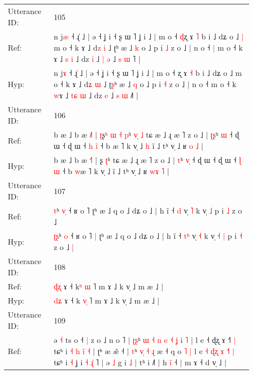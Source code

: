 \documentclass[10pt]{article}
\DeclareRobustCommand{\hl}[1]{{\textcolor{red}{#1}}}
\begin{document}
\begin{longtable}{ll}
 \\
\midrule
Utterance ID: & 105 \\
Ref: & n j\hl{æ} ˧ ɻ̍ ˩ | ə ˧ ʝ i ˧ ʂ ɯ ˥ ʝ i ˩ | m o ˧ \hl{ɖ}ʐ ɤ \hl{˥} b i ˩ dʑ o ˩\hl{ }\hl{|} m o ˧ k ɤ ˩ d\hl{z} \hl{i} ˩ ʈ\hl{}ʰ æ ˩ \hl{k} o ˩ p i \hl{˩} z o ˩ | n o ˧\hl{ }\hl{|} m o ˧ k \hl{}ɤ ˩ \hl{}\hl{s} \hl{i} ˩ dz \hl{i} ˩ \hl{|} \hl{ə} ˩\hl{ }\hl{s}\hl{ }\hl{ɯ}\hl{ }˥ |
 \\
Hyp: & n j\hl{ɤ} ˧ ɻ̍ ˩ | ə ˧ ʝ i ˧ ʂ ɯ ˥ ʝ i ˩ | m o ˧ \hl{}ʐ ɤ \hl{˧} b i ˩ dʑ o ˩\hl{}\hl{} m o ˧ k ɤ ˩ d\hl{ʑ} \hl{ɯ} ˩ ʈ\hl{ʂ}ʰ æ ˩ \hl{q} o ˩ p i \hl{˧} z o ˩ | n o ˧\hl{}\hl{} m o ˧ k \hl{w}ɤ ˩ \hl{t}\hl{ɕ} \hl{ɯ} ˩ dz \hl{e} ˩ \hl{s} \hl{ɯ} ˩\hl{}\hl{}\hl{}\hl{}\hl{}˥ |
 \\
\midrule
Utterance ID: & 106 \\
Ref: & b æ ˩ b æ \hl{˩}˥ | \hl{ʈ}ʂ\hl{ʰ}\hl{ }\hl{ɯ}\hl{ }\hl{˧} \hl{p}ʰ\hl{ }\hl{v}\hl{̩}\hl{ }\hl{˩} tɕ æ ˩ ɻ æ ˥ z o ˩ | \hl{ʈ}\hl{ʂ}ʰ \hl{}\hl{ɯ} ˧ ɖ ɯ ˧ ɖ ɯ ˧ \hl{h} \hl{i}\hl{̃} ˧ b \hl{}æ ˥ k v̩ ˩\hl{ }\hl{h} ĩ ˩ tʰ v̩ ˩ ʁ \hl{}\hl{o} \hl{˩} |
 \\
Hyp: & b æ ˩ b æ \hl{˧}˥ | \hl{}ʂ\hl{}\hl{}\hl{}\hl{}\hl{} \hl{ʈ}ʰ\hl{}\hl{}\hl{}\hl{}\hl{} tɕ æ ˩ ɻ æ ˥ z o ˩ | \hl{}\hl{t}ʰ \hl{v}\hl{̩} ˧ ɖ ɯ ˧ ɖ ɯ ˧ \hl{ɭ} \hl{}\hl{ɯ} ˧ b \hl{w}æ ˥ k v̩ ˩\hl{}\hl{} ĩ ˩ tʰ v̩ ˩ ʁ \hl{w}\hl{ɤ} \hl{˥} |
 \\
\midrule
Utterance ID: & 107 \\
Ref: & \hl{}\hl{t}ʰ \hl{v}\hl{̩} ˧ ʁ o ˥\hl{}\hl{} ʈʰ æ ˩ q o ˩ dʑ o ˩ | h ĩ ˧ \hl{}\hl{d} v̩ \hl{˥} k v̩\hl{}\hl{} \hl{˩} p i \hl{˩} z o ˩\hl{}\hl{}
 \\
Hyp: & \hl{ʈ}\hl{ʂ}ʰ \hl{}\hl{o} ˧ ʁ o ˥\hl{ }\hl{|} ʈʰ æ ˩ q o ˩ dʑ o ˩ | h ĩ ˧ \hl{t}\hl{ʰ} v̩ \hl{˧} k v̩\hl{ }\hl{˧} \hl{|} p i \hl{˧} z o ˩\hl{ }\hl{|}
 \\
\midrule
Utterance ID: & 108 \\
Ref: & \hl{ɖ}\hl{ʐ} ɤ ˧ k\hl{ʰ}\hl{ }\hl{ɯ} ˥ m ɤ ˩ k v̩ ˩ m æ ˩ |
 \\
Hyp: & \hl{d}\hl{ʑ} ɤ ˧ k\hl{ }\hl{v}\hl{̩} ˥ m ɤ ˩ k v̩ ˩ m æ ˩ |
 \\
\midrule
Utterance ID: & 109 \\
Ref: & ə \hl{˧} ts\hl{} o ˧\hl{ }\hl{|} z o ˩ n o ˥ | \hl{ʈ}\hl{ʂ}ʰ\hl{ }\hl{ɯ}\hl{ }\hl{˧}\hl{ }\hl{n}\hl{ }\hl{e}\hl{ }\hl{˧}\hl{ }\hl{ʝ} i \hl{˥} | l e ˧ ɖʐ ɤ ˧\hl{˥}\hl{ }\hl{|} tɕʰ i\hl{ }\hl{˧} \hl{h} \hl{i}\hl{̃} \hl{˧} | ʈʰ æ æ̃ ˧ | \hl{t}ʰ\hl{ }\hl{v}\hl{̩}\hl{ }\hl{˧}\hl{ }\hl{ɻ} æ ˧ q o\hl{ }\hl{˥} \hl{|} l e \hl{˧} \hl{ɖ}\hl{ʐ} \hl{ɤ} \hl{˧}\hl{˥} \hl{|} tɕʰ i\hl{ }\hl{˧} ʝ i\hl{ }\hl{˧} \hl{ɻ}\hl{̍}\hl{ }˥ | ə \hl{˩} g i \hl{˩} | tʰ i ˩˥ | h \hl{i}\hl{̃} ˧ | m ɤ ˧ d v̩ ˩ |

\end{longtable}
\end{document}
